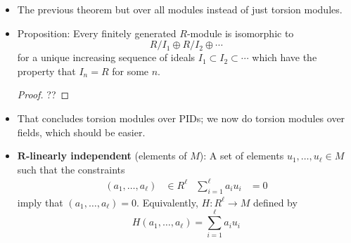 \documentclass[../notes.tex]{subfiles}
\begin{document}
\begin{itemize}
    \begin{proof}[Proof of theorem]
        Let $p_1,\dots,p_\ell$ be the set of distinct primes for which $M_{(p)}\neq 0$. Let
        \begin{equation*}
            M_{(p_i)} \cong R/(p_i^{m_{i,1}})\times R/(p_i^{m_{i,2}})\times\cdots
        \end{equation*}
        where $m_{i,1}\geq m_{i,2}\geq\cdots$. are such that there exists $N$ for which $m_{i,N}=0$. Then
        \begin{equation*}
            M/(p_j) \cong R/(p_j^{m_j,1})^\times\times R/(p_j^{m_j,2})^\times
        \end{equation*}
        Then we apply the Chinese Remainder Theorem. Define
        \begin{equation*}
            a_r = \prod_{i=1}^\ell p_i^{m_{i,r}}
        \end{equation*}
        where $a_{r+1}\mid a_r$ because $m_{i,j}$ is ?? in $j$. Use the CRT to imply that
        \begin{equation*}
            \prod_{i=1}^\ell R/(p_i^{m_i,r}) \cong R/(a_r)
        \end{equation*}
    \end{proof}
    \item The previous theorem but over all modules instead of just torsion modules.
    \item Proposition: Every finitely generated $R$-module is isomorphic to
    \begin{equation*}
        R/I_1\oplus R/I_2\oplus\cdots
    \end{equation*}
    for a unique increasing sequence of ideals $I_1\subset I_2\subset\cdots$ which have the property that $I_n=R$ for some $n$.
    \begin{proof}
        ??
    \end{proof}
    \item That concludes torsion modules over PIDs; we now do torsion modules over fields, which should be easier.
    \item \textbf{$\bm{R}$-linearly independent} (elements of $M$): A set of elements $u_1,\dots,u_\ell\in M$ such that the constraints
    \begin{align*}
        (a_1,\dots,a_\ell) &\in R^\ell&
        \sum_{i=1}^\ell a_iu_i &= 0
    \end{align*}
    imply that $(a_1,\dots,a_\ell)=0$. Equivalently, $H:R^\ell\to M$ defined by
    \begin{equation*}
        H(a_1,\dots,a_\ell) = \sum_{i=1}^\ell a_iu_i

\end{equation*}
\end{itemize}
\end{document}
